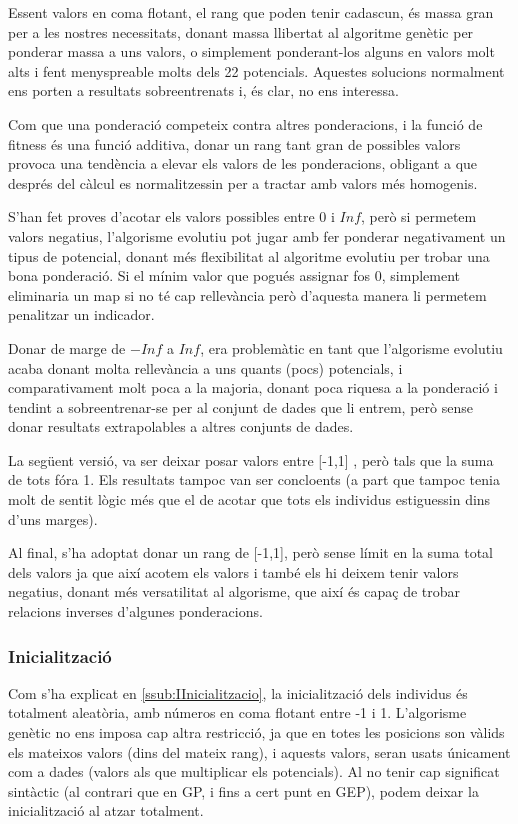 Essent valors en coma flotant, el rang que poden tenir cadascun, és massa gran
per a les nostres necessitats, donant massa llibertat al algoritme genètic per
ponderar massa a uns valors, o simplement ponderant-los alguns en valors molt alts
i fent menyspreable molts dels 22 potencials.  Aquestes solucions normalment ens
porten a resultats sobreentrenats i, és clar, no ens interessa.

Com que una ponderació competeix contra altres ponderacions, i la funció de
fitness és una funció additiva, donar un rang tant gran de possibles valors
provoca una tendència a elevar els valors de les ponderacions, obligant a que
després del càlcul es normalitzessin per a tractar amb valors més homogenis.

S'han fet proves d'acotar els valors possibles entre 0 i $Inf$, però si
permetem valors negatius, l'algorisme evolutiu pot jugar amb fer ponderar
negativament un tipus de potencial, donant més flexibilitat al algoritme
evolutiu per trobar una bona ponderació.  Si el mínim valor que pogués assignar
fos 0, simplement eliminaria un map si no té cap rellevància però d'aquesta
manera li permetem penalitzar un indicador.

Donar de marge de $-Inf$ a $Inf$, era problemàtic en tant que l'algorisme
evolutiu acaba donant molta rellevància a uns quants (pocs) potencials, i
comparativament molt poca a la majoria, donant poca riquesa a la ponderació i
tendint a sobreentrenar-se per al conjunt de dades que li entrem, però sense
donar resultats extrapolables a altres conjunts de dades.

La següent versió, va ser deixar posar valors entre [-1,1] , però tals que la
suma de tots fóra 1.  Els resultats tampoc van ser concloents (a part que tampoc
tenia molt de sentit lògic més que el de acotar que tots els individus
estiguessin dins d'uns marges).

Al final, s'ha adoptat donar un rang de [-1,1], però sense límit en la suma total
dels valors ja que així acotem els valors i també els hi deixem tenir valors
negatius, donant més versatilitat al algorisme, que així és capaç de trobar
relacions inverses d'algunes ponderacions.



\subsubsection{Inicialització} %
\label{ssub:Inicialitzacio}
Com s'ha explicat en \ref{ssub:IInicialitzacio}, la inicialització dels individus és totalment
aleatòria, amb números en coma flotant entre -1 i 1.  L'algorisme genètic no ens
imposa cap altra restricció, ja que en totes les posicions son vàlids els
mateixos valors (dins del mateix rang), i aquests valors, seran usats únicament
com a dades (valors als que multiplicar els potencials).  Al no tenir cap
significat sintàctic (al contrari que en GP, i fins a cert punt en GEP), podem
deixar la inicialització al atzar totalment.

